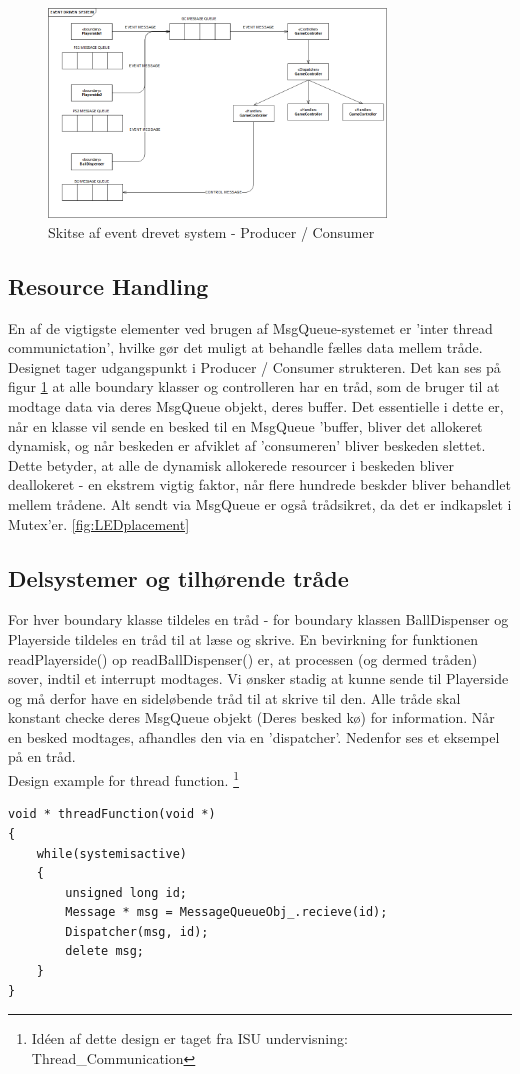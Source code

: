 \documentclass[Softwaredesign/Softwaredesign_main.tex]{subfiles}
\begin{document}
\begin{figure}[H]
    \centering
    \includegraphics[width=0.8\textwidth]{Softwaredesign/RPiApp/graphic_RPi/EDS.png}
    \caption{Skitse af event drevet system - Producer / Consumer}
    \label{fig:EDS}
\end{figure}
\subsection{Resource Handling}
En af de vigtigste elementer ved brugen af MsgQueue-systemet er 'inter thread communictation', hvilke gør det muligt at behandle fælles data mellem tråde. Designet tager udgangspunkt i Producer / Consumer strukteren. Det kan ses på figur \ref{fig:EDS} at alle boundary klasser og controlleren har en tråd, som de bruger til at modtage data via deres MsgQueue objekt, deres buffer. Det essentielle i dette er, når en klasse vil sende en besked til en MsgQueue 'buffer, bliver det allokeret dynamisk, og når beskeden er afviklet af 'consumeren' bliver beskeden slettet. Dette betyder, at alle de dynamisk allokerede resourcer i beskeden bliver deallokeret - en ekstrem vigtig faktor, når flere hundrede beskder bliver behandlet mellem trådene. Alt sendt via MsgQueue er også trådsikret, da det er indkapslet i Mutex'er. 
\ref{fig:LEDplacement}

\subsection{Delsystemer og tilhørende tråde}
For hver boundary klasse tildeles en tråd - for boundary klassen BallDispenser og Playerside tildeles en tråd til at læse og skrive. En bevirkning for funktionen readPlayerside() op readBallDispenser() er, at processen (og dermed tråden) sover, indtil et interrupt modtages.  
Vi ønsker stadig at kunne sende til Playerside og må derfor have en sideløbende tråd til at skrive til den. Alle tråde skal konstant checke deres MsgQueue objekt (Deres besked kø) for information. Når en besked modtages, afhandles den via en 'dispatcher'. Nedenfor ses et eksempel på en tråd.
\\Design example for thread function. \footnote{Idéen af dette design er taget fra ISU undervisning: Thread\_Communication}
\begin{lstlisting}[caption={Design af trådfunktion},label={lst:threadfuc}]
void * threadFunction(void *)
{
    while(systemisactive)
    {
        unsigned long id;
        Message * msg = MessageQueueObj_.recieve(id);
        Dispatcher(msg, id);
        delete msg; 
    }
}
\end{lstlisting}
\end{document}
